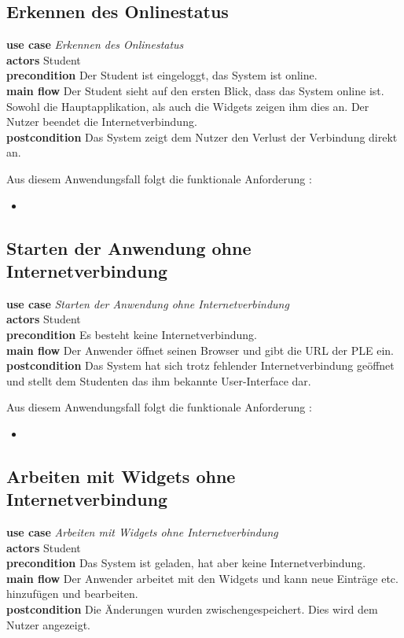 \subsection{Erkennen des Onlinestatus}
\textbf{use case} \emph{Erkennen des Onlinestatus}\\
\textbf{actors} Student\\
\textbf{precondition} Der Student ist eingeloggt, das System ist online.\\
\textbf{main flow} Der Student sieht auf den ersten Blick, dass das System online ist. Sowohl die Hauptapplikation, als auch die Widgets zeigen ihm dies an. Der Nutzer beendet die Internetverbindung.\\
\textbf{postcondition} Das System zeigt dem Nutzer den Verlust der Verbindung direkt an.
 
Aus diesem Anwendungsfall folgt die funktionale Anforderung :
\begin{itemize}
 \item \requirement{\requirementCheckOnlineStatus}\label{requirementCheckOnlineStatus}
\end{itemize}

\subsection{Starten der Anwendung ohne Internetverbindung}
\textbf{use case} \emph{Starten der Anwendung ohne Internetverbindung}\\
\textbf{actors} Student\\
\textbf{precondition} Es besteht keine Internetverbindung.\\
\textbf{main flow} Der Anwender öffnet seinen Browser und gibt die URL der PLE ein.\\
\textbf{postcondition} Das System hat sich trotz fehlender Internetverbindung geöffnet und stellt dem Studenten das ihm bekannte User-Interface dar.
 
Aus diesem Anwendungsfall folgt die funktionale Anforderung :
\begin{itemize}
 \item \requirement{\requirementOfflineStart}\label{requirementOfflineStart}
\end{itemize}

\subsection{Arbeiten mit Widgets ohne Internetverbindung}
\textbf{use case} \emph{Arbeiten mit Widgets ohne Internetverbindung}\\
\textbf{actors} Student\\
\textbf{precondition} Das System ist geladen, hat aber keine Internetverbindung.\\
\textbf{main flow} Der Anwender arbeitet mit den Widgets und kann neue Einträge etc. hinzufügen und bearbeiten.\\
\textbf{postcondition} Die Änderungen wurden zwischengespeichert. Dies wird dem Nutzer angezeigt.

